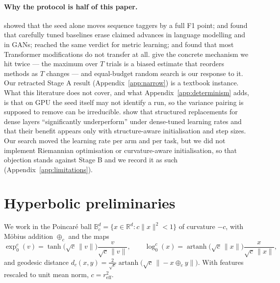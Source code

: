 \documentclass{article}
\begin{document}
\paragraph{Why the protocol is half of this paper.} \citet{reimers2017scoredistributions}
showed that the seed alone moves sequence taggers by a full F1 point;
\citet{melis2018stateoftheart} and \citet{lucic2018gans} found that carefully
tuned baselines erase claimed advances in language modelling and in GANs;
\citet{musgrave2020realitycheck} reached the same verdict for metric learning;
and \citet{narang2021modifications} found that most Transformer modifications do
not transfer at all. \citet{dodge2019showyourwork} give the concrete mechanism
we hit twice --- the maximum over $T$ trials is a biased estimate that reorders
methods as $T$ changes --- and equal-budget random search
\citep{bergstra2012randomsearch} is our response to it. Our retracted Stage A
result (Appendix~\ref{app:narrow}) is a textbook instance. What this literature
does not cover, and what Appendix~\ref{app:determinism} adds, is that on GPU the
seed itself may not identify a run, so the variance pairing is supposed to
remove can be irreducible. \citet{qiu2024computebetterspent} show that
structured replacements for dense layers ``significantly underperform'' under
dense-tuned learning rates and that their benefit appears only with
structure-aware initialisation and step sizes. Our search moved the learning
rate per arm and per task, but we did not implement Riemannian optimisation or
curvature-aware initialisation, so that objection stands against Stage B and we
record it as such (Appendix~\ref{app:limitations}).

\section{Hyperbolic preliminaries}
\label{app:math}

We work in the Poincar\'e ball
$\mathbb{B}^d_c = \{x \in \mathbb{R}^d : c\|x\|^2 < 1\}$ of curvature $-c$,
with M\"obius addition $\oplus_c$ and the maps
\begin{equation}
\exp^c_0(v) = \tanh\!\big(\sqrt{c}\,\|v\|\big)\frac{v}{\sqrt{c}\,\|v\|},
\qquad
\log^c_0(x) = \operatorname{artanh}\!\big(\sqrt{c}\,\|x\|\big)\frac{x}{\sqrt{c}\,\|x\|},
\end{equation}
and geodesic distance
$d_c(x,y) = \tfrac{2}{\sqrt{c}}\operatorname{artanh}\big(\sqrt{c}\,\|{-}x \oplus_c y\|\big)$.
With features rescaled to unit mean norm, $c = r_{\text{eff}}^2$.
\end{document}
